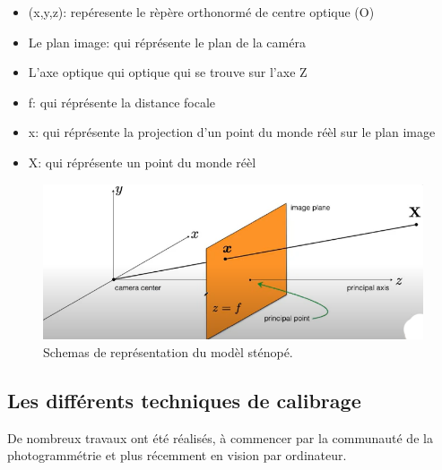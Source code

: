 \begin{itemize}
	\item (x,y,z): repéresente le rèpère orthonormé de centre optique (O)
	\item  Le plan image: qui réprésente le plan de la caméra 
	\item  L'axe optique qui optique qui se trouve sur l'axe Z
	\item  f: qui réprésente la distance focale
	\item  x: qui réprésente la projection d'un point du monde réèl sur le plan image
	\item  X: qui réprésente un point du monde réèl
\end{itemize}
\vspace{-0.3 cm}
\begin{figure}[h]
	\centering
	\includegraphics[scale=0.70]{image/ModelStenope.png}
	\decoRule
	\caption[Représentation du modèl sténopé]{Schemas de représentation du modèl sténopé.}
	\label{fig:Représentation du modèl sténopé}
\end{figure}

\subsection{Les différents techniques de calibrage}

 De nombreux travaux ont été réalisés, à commencer par la communauté de la photogrammétrie et plus récemment en vision par ordinateur.\\
 
